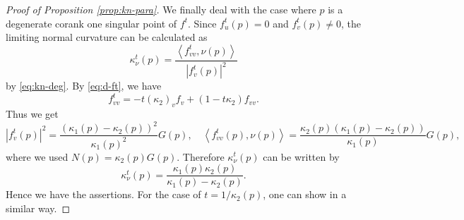 \documentclass[11pt,a4paper,pdflatex,final]{amsart}
\theoremstyle{plain}
\theoremstyle{definition}
\theoremstyle{remark}
\newcommand{\0}{\bm{0}}
\newcommand{\inner}[2]{\left\langle{#1},{#2}\right\rangle}
\numberwithin{equation}{section}
\begin{document}
\begin{proof}[Proof of Proposition \ref{prop:kn-para}]
We finally deal with the case where $p$ is a degenerate corank one singular point of $f^t$. 
Since $f^t_u(p)=0$ and $f^t_v(p)\neq0$, 
the limiting normal curvature can be calculated as 
\[
\kappa_\nu^t(p)=\frac{\inner{f^t_{vv}}{\nu(p)}}{|f^t_v(p)|^2}
\]
{by \eqref{eq:kn-deg}}. 
By \eqref{eq:d-ft}, we have 
\[
f^t_{vv}=-t(\kappa_2)_vf_v+(1-t\kappa_2)f_{vv}.
\]
Thus we get 
\[
|f^t_v(p)|^2=\frac{(\kappa_1(p)-\kappa_2(p))^2}{\kappa_1(p)^2}G(p),\quad 
\inner{f^t_{vv}(p)}{\nu(p)}
=\frac{\kappa_2(p)(\kappa_1(p)-\kappa_2(p))}{\kappa_1(p)}G(p),
\]
where we used $N(p)=\kappa_2(p)G(p)$. 
Therefore $\kappa_\nu^t(p)$ can be written by 
\[
\kappa_\nu^t(p)=\frac{\kappa_1(p)\kappa_2(p)}{\kappa_1(p)-\kappa_2(p)}.
\]
Hence we have the assertions. 
{For the case of $t=1/\kappa_2(p)$, one can show in a similar way.}
\end{proof} 
\end{document}
